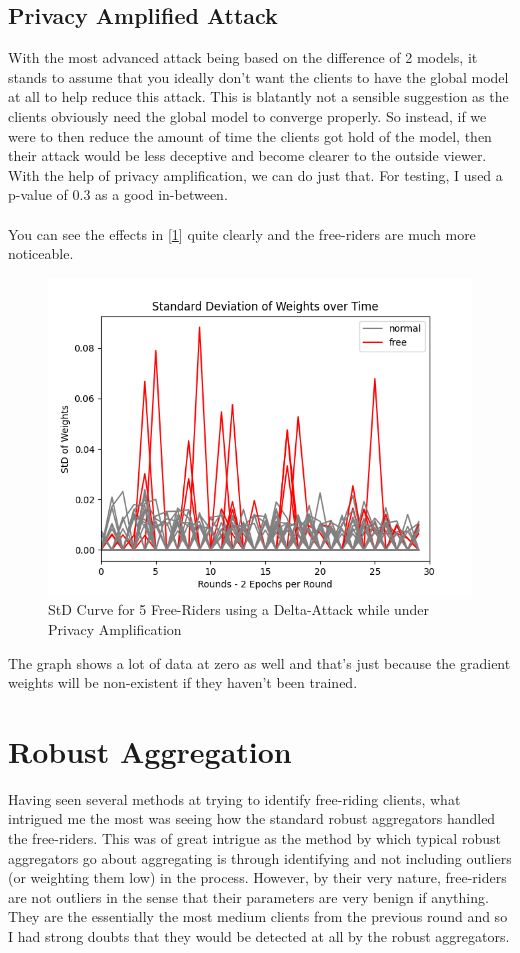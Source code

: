 \subsection{Privacy Amplified Attack}
With the most advanced attack being based on the difference of 2 models, it stands to assume that you ideally don't want the clients to have the global model at all to help reduce this attack.
This is blatantly not a sensible suggestion as the clients obviously need the global model to converge properly.
So instead, if we were to then reduce the amount of time the clients got hold of the model, then their attack would be less deceptive and become clearer to the outside viewer.
With the help of privacy amplification, we can do just that.
For testing, I used a p-value of 0.3 as a good in-between.
\\ \\
You can see the effects in [\ref{fig:std_priv}] quite clearly and the free-riders are much more noticeable.
\begin{figure}[htbp]
	\centering
    \includegraphics[scale=0.5]{free_riders/graphs/priv5.png}
	\caption{StD Curve for 5 Free-Riders using a Delta-Attack while under Privacy Amplification}
	\label{fig:std_priv}
\end{figure}
The graph shows a lot of data at zero as well and that's just because the gradient weights will be non-existent if they haven't been trained.


\section{Robust Aggregation}
Having seen several methods at trying to identify free-riding clients, what intrigued me the most was seeing how the standard robust aggregators handled the free-riders.
This was of great intrigue as the method by which typical robust aggregators go about aggregating is through identifying and not including outliers (or weighting them low) in the process.
However, by their very nature, free-riders are not outliers in the sense that their parameters are very benign if anything.
They are the essentially the most medium clients from the previous round and so I had strong doubts that they would be detected at all by the robust aggregators.

